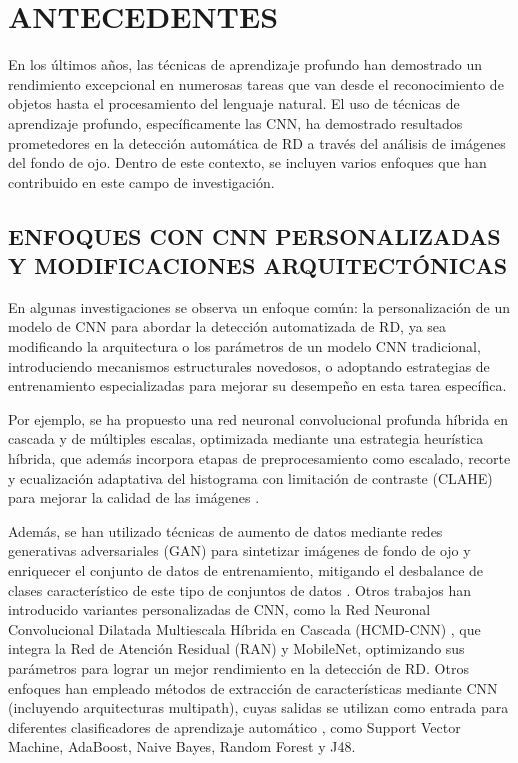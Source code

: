 \chapter{ANTECEDENTES} \label{chap:trabajos-previos}

En los últimos años, las técnicas de aprendizaje profundo han demostrado un rendimiento
excepcional en numerosas tareas que van desde el reconocimiento de objetos hasta el
procesamiento del lenguaje natural. El uso de técnicas de aprendizaje profundo,
específicamente las CNN, ha demostrado resultados
prometedores en la detección automática de RD a través del análisis de imágenes del fondo
de ojo. Dentro de este contexto, se incluyen varios enfoques que han contribuido en este
campo de investigación.

\section{ENFOQUES CON CNN PERSONALIZADAS Y MODIFICACIONES ARQUITECTÓNICAS}

En algunas investigaciones se observa un enfoque común: la personalización de un modelo
de CNN para abordar la detección automatizada de RD,
ya sea modificando la arquitectura o los parámetros de un modelo CNN
tradicional, introduciendo mecanismos estructurales novedosos, o adoptando estrategias de
entrenamiento especializadas para mejorar su desempeño en esta tarea específica.

Por ejemplo, se ha propuesto una red neuronal convolucional profunda híbrida en cascada y
de múltiples escalas, optimizada mediante una estrategia heurística híbrida, que además
incorpora etapas de preprocesamiento como escalado, recorte y ecualización adaptativa del
histograma con limitación de contraste (CLAHE) para mejorar la calidad de las imágenes
.

Además, se han utilizado técnicas de aumento de datos mediante redes generativas
adversariales (GAN) para sintetizar imágenes de fondo de ojo y enriquecer el conjunto de
datos de entrenamiento, mitigando el desbalance de clases característico de este tipo de
conjuntos de datos . Otros trabajos han introducido variantes
personalizadas de CNN, como la Red Neuronal Convolucional Dilatada Multiescala Híbrida en
Cascada (HCMD-CNN) , que integra la Red de Atención
Residual (RAN) y MobileNet, optimizando sus parámetros para lograr un mejor rendimiento en
la detección de RD. Otros enfoques han empleado métodos de extracción de características
mediante CNN (incluyendo arquitecturas multipath), cuyas salidas se utilizan como entrada
para diferentes clasificadores de aprendizaje automático 
, como Support Vector Machine, AdaBoost, Naive Bayes,
Random Forest y J48.

